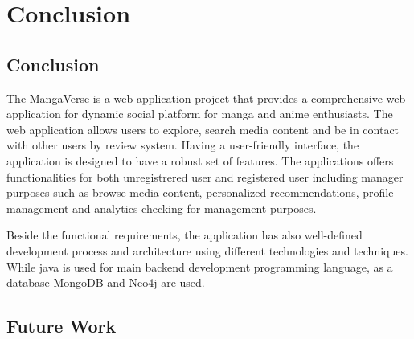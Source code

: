 \chapter{Conclusion}

\section{Conclusion}
The MangaVerse is a web application project that provides a comprehensive web application for 
dynamic social platform for manga and anime enthusiasts. The web application allows users to explore, search media content
and be in contact with other users by review system. Having a user-friendly interface, the application is designed to have a robust set of features.
The applications offers functionalities for both unregistrered user and registered user including manager purposes such as browse 
media content, personalized recommendations, profile management and analytics checking for management purposes.

Beside the functional requirements, the application has also well-defined development process and architecture using 
different technologies and techniques. While java is used for main backend development programming language, as a database MongoDB and
Neo4j are used. 



\section{Future Work}

